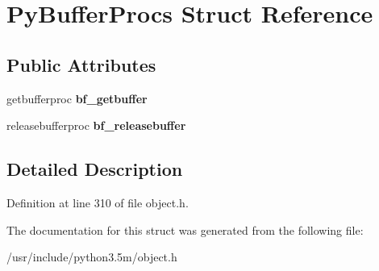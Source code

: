 \hypertarget{structPyBufferProcs}{}\section{Py\+Buffer\+Procs Struct Reference}
\label{structPyBufferProcs}
\subsection*{Public Attributes}
\begin{DoxyCompactItemize}
\item 
getbufferproc {\bfseries bf\+\_\+getbuffer}\hypertarget{structPyBufferProcs_a082f280ae44aa17f4028a12e58cf77be}{}\label{structPyBufferProcs_a082f280ae44aa17f4028a12e58cf77be}

\item 
releasebufferproc {\bfseries bf\+\_\+releasebuffer}\hypertarget{structPyBufferProcs_a549a6d721c9ee3d138b92ac495ad59a1}{}\label{structPyBufferProcs_a549a6d721c9ee3d138b92ac495ad59a1}

\end{DoxyCompactItemize}


\subsection{Detailed Description}


Definition at line 310 of file object.\+h.



The documentation for this struct was generated from the following file\+:\begin{DoxyCompactItemize}
\item 
/usr/include/python3.\+5m/object.\+h\end{DoxyCompactItemize}

